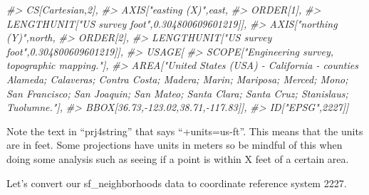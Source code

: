 \documentclass[
]{krantz}
\makeatletter
\newenvironment{Shaded}{\begin{snugshade}}{\end{snugshade}}
\newcommand{\CommentTok}[1]{\textcolor[rgb]{0.37,0.37,0.37}{\textit{#1}}}
\newenvironment{kframe}{%
\medskip{}
\setlength{\fboxsep}{.8em}
 \def\at@end@of@kframe{}%
 \ifinner\ifhmode%
  \def\at@end@of@kframe{\end{minipage}}%
  \begin{minipage}{\columnwidth}%
 \fi\fi%
 \def\FrameCommand##1{\hskip\@totalleftmargin \hskip-\fboxsep
 \colorbox{shadecolor}{##1}\hskip-\fboxsep
     \hskip-\linewidth \hskip-\@totalleftmargin \hskip\columnwidth}%
 \MakeFramed {\advance\hsize-\width
   \@totalleftmargin\z@ \linewidth\hsize
   \@setminipage}}%
 {\par\unskip\endMakeFramed%
 \at@end@of@kframe}
\renewenvironment{Shaded}{\begin{kframe}}{\end{kframe}}
\makeatother
\begin{document}
\begin{Shaded}
\begin{Highlighting}[]
\CommentTok{\#\textgreater{}     CS[Cartesian,2],}
\CommentTok{\#\textgreater{}         AXIS["easting (X)",east,}
\CommentTok{\#\textgreater{}             ORDER[1],}
\CommentTok{\#\textgreater{}             LENGTHUNIT["US survey foot",0.304800609601219]],}
\CommentTok{\#\textgreater{}         AXIS["northing (Y)",north,}
\CommentTok{\#\textgreater{}             ORDER[2],}
\CommentTok{\#\textgreater{}             LENGTHUNIT["US survey foot",0.304800609601219]],}
\CommentTok{\#\textgreater{}     USAGE[}
\CommentTok{\#\textgreater{}         SCOPE["Engineering survey, topographic mapping."],}
\CommentTok{\#\textgreater{}         AREA["United States (USA) {-} California {-} counties Alameda; Calaveras; Contra Costa; Madera; Marin; Mariposa; Merced; Mono; San Francisco; San Joaquin; San Mateo; Santa Clara; Santa Cruz; Stanislaus; Tuolumne."],}
\CommentTok{\#\textgreater{}         BBOX[36.73,{-}123.02,38.71,{-}117.83]],}
\CommentTok{\#\textgreater{}     ID["EPSG",2227]]}
\end{Highlighting}
\end{Shaded}

Note the text in ``prj4string'' that says ``+units=us-ft''. This means that the units are in feet. Some projections have units in meters so be mindful of this when doing some analysis such as seeing if a point is within X feet of a certain area.

Let's convert our sf\_neighborhoods data to coordinate reference system 2227.
\end{document}
